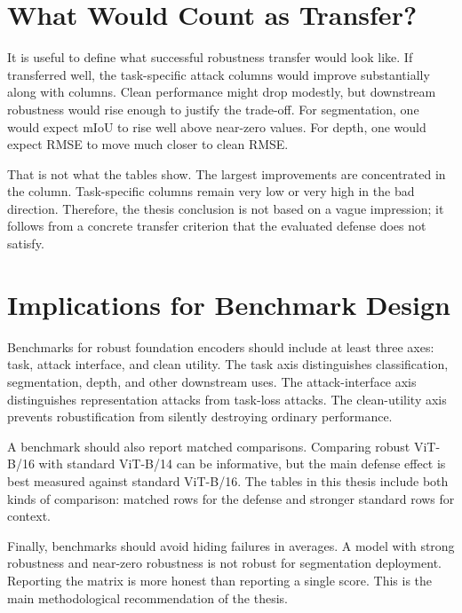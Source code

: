 \section{What Would Count as Transfer?}

It is useful to define what successful robustness transfer would look like. If \DeACL transferred well, the task-specific attack columns would improve substantially along with \EmbedAttack columns. Clean performance might drop modestly, but downstream robustness would rise enough to justify the trade-off. For segmentation, one would expect \SegPGD mIoU to rise well above near-zero values. For depth, one would expect \DepthPGD RMSE to move much closer to clean RMSE.

That is not what the tables show. The largest improvements are concentrated in the \EmbedAttack column. Task-specific columns remain very low or very high in the bad direction. Therefore, the thesis conclusion is not based on a vague impression; it follows from a concrete transfer criterion that the evaluated defense does not satisfy.

\section{Implications for Benchmark Design}

Benchmarks for robust foundation encoders should include at least three axes: task, attack interface, and clean utility. The task axis distinguishes classification, segmentation, depth, and other downstream uses. The attack-interface axis distinguishes representation attacks from task-loss attacks. The clean-utility axis prevents robustification from silently destroying ordinary performance.

A benchmark should also report matched comparisons. Comparing robust \DINO ViT-B/16 with standard \DINOv ViT-B/14 can be informative, but the main defense effect is best measured against standard \DINO ViT-B/16. The tables in this thesis include both kinds of comparison: matched rows for the defense and stronger standard rows for context.

Finally, benchmarks should avoid hiding failures in averages. A model with strong \EmbedAttack robustness and near-zero \SegPGD robustness is not robust for segmentation deployment. Reporting the matrix is more honest than reporting a single score. This is the main methodological recommendation of the thesis.
